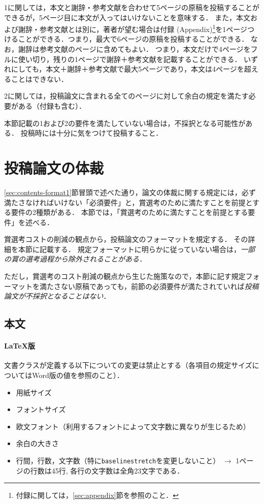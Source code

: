 \documentclass[
  platex, dvipdfmx,  %
]{nlp2024}
\newcommand{\code}[1]{\texttt{#1}}
\begin{document}
1に関しては，本文と謝辞・参考文献を合わせて5ページの原稿を投稿することができるが，5ページ目に本文が入ってはいけないことを意味する．
また，本文および謝辞・参考文献とは別に，著者が望む場合は付録 (Appendix)\footnote{付録に関しては，\ref{sec:appendix}節を参照のこと．}を1ページつけることができる．つまり，最大で6ページの原稿を投稿することができる．
なお，謝辞は参考文献のページに含めてもよい．
つまり，本文だけで4ページをフルに使い切り，残りの1ページで謝辞＋参考文献を記載することができる．
いずれにしても，本文＋謝辞＋参考文献で最大5ページであり，本文は4ページを超えることはできない．


2に関しては，投稿論文に含まれる全てのページに対して余白の規定を満たす必要がある（付録も含む）．

本節記載の1および2の要件を満たしていない場合は，不採択となる可能性がある．
投稿時には十分に気をつけて投稿すること．



\section{投稿論文の体裁}
\label{sec:contents-format2}
\ref{sec:contents-format1}節冒頭で述べた通り，論文の体裁に関する規定には，必ず満たさなければいけない「必須要件」と，賞選考のために満たすことを前提とする要件の2種類がある．
本節では，「賞選考のために満たすことを前提とする要件」を述べる．

賞選考コストの削減の観点から，投稿論文のフォーマットを規定する．
その詳細を本節に記載する．
規定フォーマットに明らかに従っていない場合は，\emph{一部の賞の選考過程から除外されることがある．}

ただし，賞選考のコスト削減の観点から生じた施策なので，本節に記す規定フォーマットを満たさない原稿であっても，前節の必須要件が満たされていれば\emph{投稿論文が不採択となることはない}．



\subsection{本文}

\paragraph{LaTeX版}
文書クラスが定義する以下についての変更は禁止とする（各項目の規定サイズについてはWord版の値を参照のこと）．
\begin{itemize}
\item 用紙サイズ
\item フォントサイズ
\item 欧文フォント（利用するフォントによって文字数に異なりが生じるため）
\item 余白の大きさ
\item 行間，行数，文字数（特に\code{baselinestretch}を変更しないこと） $\rightarrow$ 1ページの行数は45行, 各行の文字数は全角23文字である．
\end{itemize}
\end{document}
